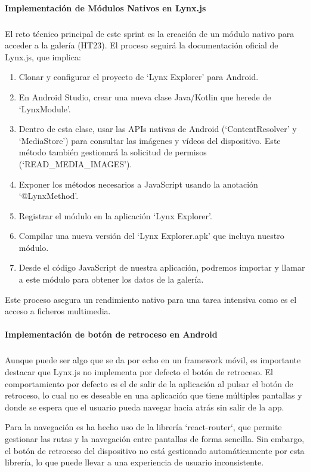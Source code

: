 \paragraph{Implementación de Módulos Nativos en Lynx.js}
\subparagraph{}
El reto técnico principal de este sprint es la creación de un módulo nativo para acceder a la galería (HT23). El proceso seguirá la documentación oficial de Lynx.js, que implica:
\begin{enumerate}
    \item Clonar y configurar el proyecto de `Lynx Explorer' para Android.
    \item En Android Studio, crear una nueva clase Java/Kotlin que herede de `LynxModule'.
    \item Dentro de esta clase, usar las APIs nativas de Android (`ContentResolver' y `MediaStore') para consultar las imágenes y vídeos del dispositivo. Este método también gestionará la solicitud de permisos (`READ\_MEDIA\_IMAGES').
    \item Exponer los métodos necesarios a JavaScript usando la anotación `@LynxMethod'.
    \item Registrar el módulo en la aplicación `Lynx Explorer'.
    \item Compilar una nueva versión del `Lynx Explorer.apk' que incluya nuestro módulo.
    \item Desde el código JavaScript de nuestra aplicación, podremos importar y llamar a este módulo para obtener los datos de la galería.
\end{enumerate}
Este proceso asegura un rendimiento nativo para una tarea intensiva como es el acceso a ficheros multimedia.

\paragraph{Implementación de botón de retroceso en Android}
\subparagraph{}
Aunque puede ser algo que se da por echo en un framework móvil, es importante destacar que Lynx.js no implementa por defecto el botón de retroceso.
El comportamiento por defecto es el de salir de la aplicación al pulsar el botón de retroceso, lo cual no es deseable en una aplicación que tiene múltiples pantallas y donde se espera que el usuario pueda navegar hacia atrás sin salir de la app.

Para la navegación es ha hecho uso de la librería `react-router`, que permite gestionar las rutas y la navegación entre pantallas de forma sencilla.
Sin embargo, el botón de retroceso del dispositivo no está gestionado automáticamente por esta librería, lo que puede llevar a una experiencia de usuario inconsistente.

